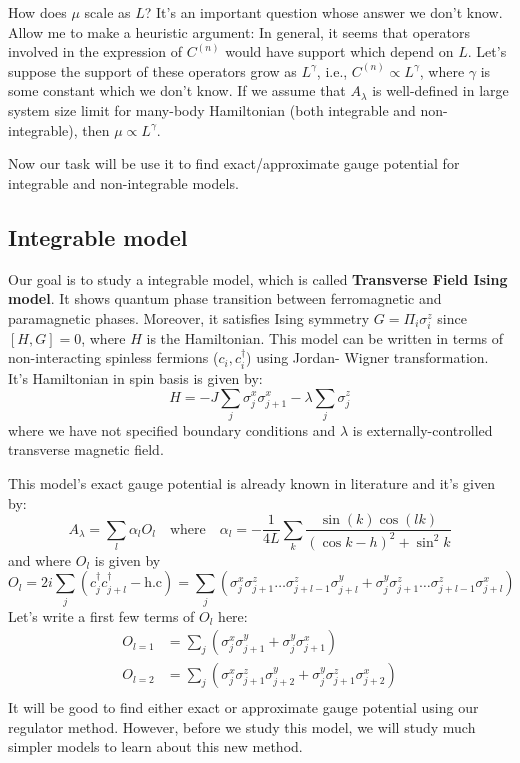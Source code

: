 \documentclass[11pt,a4paper]{article}
\begin{document}
How does $\mu$ scale as $L$? It's an important question whose answer we don't know. Allow me to make a heuristic argument: In general, it seems that operators involved in the expression of $C^{(n)}$ would have support which depend on $L$. Let's suppose the support of these operators grow as $L^{\gamma}$, i.e., $C^{(n)} \propto L^{\gamma}$, where $\gamma$ is some constant which we don't know. If we assume that $ A_{\lambda}$ is well-defined in large system size limit for many-body Hamiltonian (both integrable and non-integrable), then  $\mu \propto L^{\gamma}$.

Now our task will be use it to find exact/approximate gauge potential for integrable and non-integrable models.

\subsection{Integrable model}
Our goal is to study a integrable model, which is called \textbf{Transverse Field Ising model}. It shows quantum phase transition between ferromagnetic and paramagnetic phases. Moreover, it satisfies Ising symmetry $G= \Pi_i \sigma_i^z$ since $[H, G]=0$, where $H$ is the Hamiltonian.
This model can be written in terms of non-interacting spinless fermions ($c_i, c^{\dagger}_i $) using Jordan- Wigner transformation. It's Hamiltonian in spin basis is given by:
\begin{equation}
H= -J \sum_{j} \sigma_j^x \sigma_{j+1}^x - \lambda \sum_{j} \sigma_j^z 
\label{xx_z}
\end{equation}
where we have not specified boundary conditions and $\lambda$ is externally-controlled transverse magnetic field.

This model's exact gauge potential is already known in literature \cite{del2012assisted, kolodrubetz2016geometry} and it's given by:
\begin{equation}
A_{\lambda}= \sum_l \alpha_l O_l \quad \mbox{where} \quad \alpha_l= -\dfrac{1}{4 L} \sum_k \dfrac{\sin(k) \cos(lk)}{(\cos k - h)^2 + \sin^2 k}
\end{equation}
and where  $O_l$ is given by
\begin{equation}
O_l= 2 i \sum_j (c^{\dagger}_{j} c^{\dagger}_{j+l} - \mbox{h.c})= \sum_j ( \sigma_j^x \sigma_{j+1}^z \ldots \sigma_{j+l-1}^z \sigma_{j+l}^y +  \sigma_j^y \sigma_{j+1}^z \ldots \sigma_{j+l-1}^z \sigma_{j+l}^x)
\end{equation}
Let's write a first few terms of $O_l$ here:
\begin{align*}
O_{l=1}&=  \sum_j ( \sigma_j^x  \sigma_{j+1}^y +  \sigma_j^y  \sigma_{j+1}^x) \\
O_{l=2} &=  \sum_j ( \sigma_j^x \sigma_{j+1}^z \sigma_{j+2}^y +  \sigma_j^y \sigma_{j+1}^z \sigma_{j+2}^x) \\
\end{align*}
It will be good to find either exact or approximate gauge potential using our regulator method. However, before we study this model, we will study much simpler models to learn about this new method.
\end{document}
